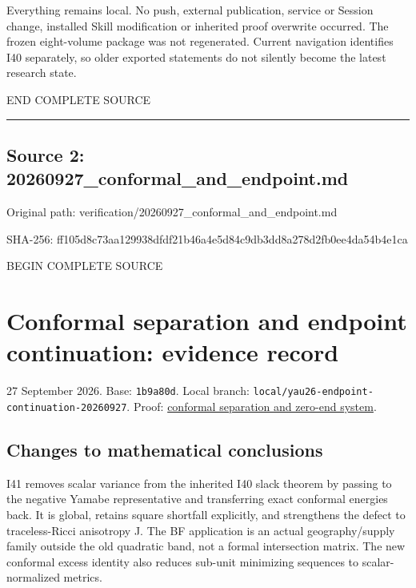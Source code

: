 \documentclass[
  10pt,
]{article}
\begin{document}
Everything remains local. No push, external publication, service or
Session change, installed Skill modification or inherited proof
overwrite occurred. The frozen eight-volume package was not regenerated.
Current navigation identifies I40 separately, so older exported
statements do not silently become the latest research state.

END COMPLETE SOURCE

\begin{center}\rule{0.5\linewidth}{0.5pt}\end{center}

\hypertarget{source-2-20260927_conformal_and_endpoint.md}{%
\subsection{Source 2:
20260927\_conformal\_and\_endpoint.md}\label{source-2-20260927_conformal_and_endpoint.md}}

Original path: verification/20260927\_conformal\_and\_endpoint.md

SHA-256:
ff105d8c73aa129938dfdf21b46a4e5d84c9db3dd8a278d2fb0ee4da54b4e1ca

BEGIN COMPLETE SOURCE

\hypertarget{conformal-separation-and-endpoint-continuation-evidence-record}{%
\section{Conformal separation and endpoint continuation: evidence
record}\label{conformal-separation-and-endpoint-continuation-evidence-record}}

27 September 2026. Base: \texttt{1b9a80d}. Local branch:
\texttt{local/yau26-endpoint-continuation-20260927}. Proof:
\href{../continuation/20260927_conformal_separation_and_zero_end.md}{conformal
separation and zero-end system}.

\hypertarget{changes-to-mathematical-conclusions}{%
\subsection{Changes to mathematical
conclusions}\label{changes-to-mathematical-conclusions}}

I41 removes scalar variance from the inherited I40 slack theorem by
passing to the negative Yamabe representative and transferring exact
conformal energies back. It is global, retains square shortfall
explicitly, and strengthens the defect to traceless-Ricci anisotropy J.
The BF application is an actual geography/supply family outside the old
quadratic band, not a formal intersection matrix. The new conformal
excess identity also reduces sub-unit minimizing sequences to
scalar-normalized metrics.
\end{document}
